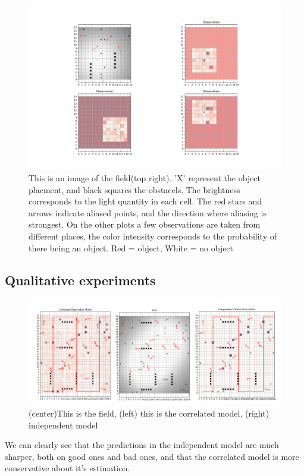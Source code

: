 \documentclass{article}
\begin{document}
	\begin{figure}[t]
		\centering
		\includegraphics[width=0.7\linewidth, height=0.3\textheight]{../figures/exploring_field}
		\caption[Exploring the field]{This is an image of the field(top right). 'X' represent the object placment, and black squares the obstacels. The brightness corresponds to the light quantity in each cell. The red stars and arrows indicate aliased points, and the direction where aliasing is strongest. On the other plots a few observations are taken from different places, the color intensity corresponds to the probability of there being an object. Red = object, White = no object}
		\label{fig:exploringfield}
	\end{figure}

	\subsection{Qualitative experiments}
	\begin{figure}[!h]
		\centering
		\includegraphics[width=0.9\linewidth, height=0.3\textheight]{../figures/independent_vs_correlated1}
		\caption{(center)This is the field, (left) this is the correlated model, (right) independent model}
		\label{fig:indvscorr}
	\end{figure}
	We can clearly see that the predictions in the independent model are much sharper, both on good ones and bad ones, and that the correlated model is more conservative about it's estimation. 
	
\end{document}
